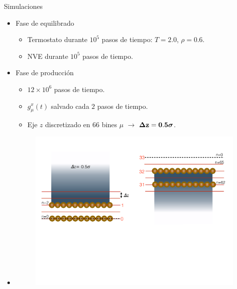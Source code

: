 \documentclass{beamer}
\begin{document}
\begin{frame}{Simulaciones}
   \begin{itemize}
     \item<1-> Fase de \alert{equilibrado}
       \begin{itemize}
         \item Termostato durante $10^5$ pasos de tiempo: $T=2.0$, $\rho=0.6$.
         \item NVE durante $10^5$ pasos de tiempo.
          \end{itemize}
        \item<2-> Fase de \alert{producción}
       \begin{itemize}
         \item $12\times10^6$ pasos de tiempo.
         \item $g_{\mu}^x(t)$ salvado cada $2$ pasos de tiempo.
         \item Eje $z$ discretizado en $66$ bines $\mu$ $\rightarrow$ {$\boldsymbol{\Delta} {\bf z=0.5}\boldsymbol{\sigma}$}.
         \end{itemize}
       \item<3->[]
         \begin{figure}
    \includegraphics[width=\linewidth]{bin_size_top-bottom}
  \end{figure}
     \end{itemize}

 \end{frame}
\end{document}
